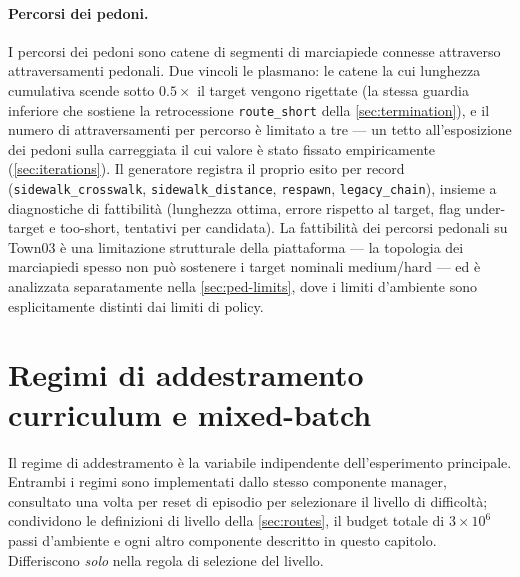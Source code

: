 \paragraph{Percorsi dei pedoni.}
I percorsi dei pedoni sono catene di segmenti di marciapiede connesse
attraverso attraversamenti pedonali. Due vincoli le plasmano: le catene
la cui lunghezza cumulativa scende sotto $0.5 \times$ il target vengono
rigettate (la stessa guardia inferiore che sostiene la retrocessione
\texttt{route\_short} della \cref{sec:termination}), e il numero di
attraversamenti per percorso è limitato a tre --- un tetto
all'esposizione dei pedoni sulla carreggiata il cui valore è stato
fissato empiricamente (\cref{sec:iterations}). Il generatore registra il
proprio esito per record (\texttt{sidewalk\_crosswalk},
\texttt{sidewalk\_distance}, \texttt{respawn}, \texttt{legacy\_chain}),
insieme a diagnostiche di fattibilità (lunghezza ottima, errore rispetto
al target, flag under-target e too-short, tentativi per candidata). La
fattibilità dei percorsi pedonali su Town03 è una limitazione
strutturale della piattaforma --- la topologia dei marciapiedi spesso
non può sostenere i target nominali medium/hard --- ed è analizzata
separatamente nella \cref{sec:ped-limits}, dove i limiti d'ambiente sono
esplicitamente distinti dai limiti di policy.


\section{Regimi di addestramento curriculum e mixed-batch}
\label{sec:regimes}

Il regime di addestramento è la variabile indipendente dell'esperimento
principale. Entrambi i regimi sono implementati dallo stesso componente
manager, consultato una volta per reset di episodio per selezionare il
livello di difficoltà; condividono le definizioni di livello della
\cref{sec:routes}, il budget totale di $3 \times 10^6$ passi d'ambiente
e ogni altro componente descritto in questo capitolo. Differiscono
\emph{solo} nella regola di selezione del livello.

